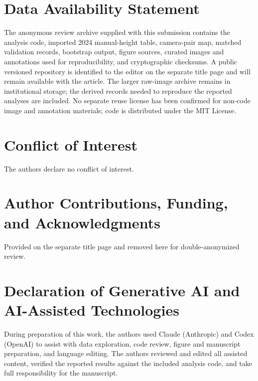 \documentclass[review,12pt,authoryear]{elsarticle}
\begin{document}
\section*{Data Availability Statement}
The anonymous review archive supplied with this submission contains the analysis code, imported 2024 manual-height table, camera-pair map, matched validation records, bootstrap output, figure sources, curated images and annotations used for reproducibility, and cryptographic checksums. A public versioned repository is identified to the editor on the separate title page and will remain available with the article. The larger raw-image archive remains in institutional storage; the derived records needed to reproduce the reported analyses are included. No separate reuse license has been confirmed for non-code image and annotation materials; code is distributed under the MIT License.

\section*{Conflict of Interest}
The authors declare no conflict of interest.

\section*{Author Contributions, Funding, and Acknowledgments}
Provided on the separate title page and removed here for double-anonymized review.

\section*{Declaration of Generative AI and AI-Assisted Technologies}
During preparation of this work, the authors used Claude (Anthropic) and Codex (OpenAI) to assist with data exploration, code review, figure and manuscript preparation, and language editing. The authors reviewed and edited all assisted content, verified the reported results against the included analysis code, and take full responsibility for the manuscript.




\end{document}
